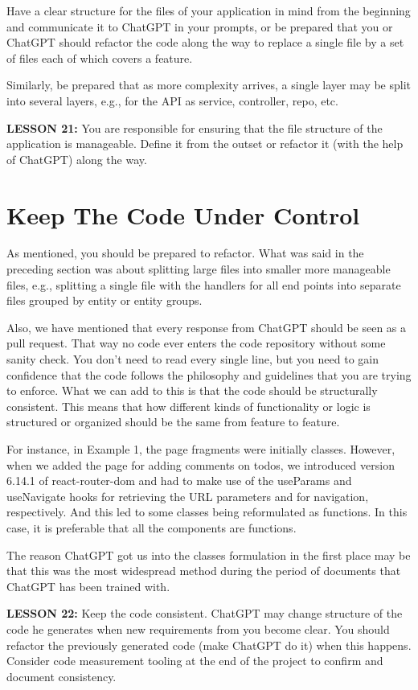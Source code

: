 \documentclass[runningheads]{llncs}
\begin{document}
Have a clear structure for the files of your application in mind from the beginning and communicate it to ChatGPT in your prompts, or be prepared that you or ChatGPT should refactor the code along the way to replace a single file by a set of files each of which covers a feature.

Similarly, be prepared that as more complexity arrives, a single layer may be split into several layers, e.g., for the API as service, controller, repo, etc.

\textbf{LESSON 21:} You are responsible for ensuring that the file structure of the application is manageable. Define it from the outset or refactor it (with the help of ChatGPT) along the way.

\section{Keep The Code Under Control}
As mentioned, you should be prepared to refactor. What was said in the preceding section was about splitting large files into smaller more manageable files, e.g., 
splitting a single file with the handlers for all end points into separate files grouped by entity or entity groups.

Also, we have mentioned that every response from ChatGPT should be seen as a pull request. That way no code ever enters the code repository without some sanity check. You don't need to read every single line, but you need to gain confidence that the code follows the philosophy and guidelines that you are trying to enforce. What we can add to this is that the code should be structurally consistent. This means that how different kinds of functionality or logic is structured or organized should be the same from feature to feature.
  
 For instance, in Example 1, the page fragments were initially classes. However, when we added the page for adding comments on todos, we introduced version 6.14.1 of react-router-dom and had to make use of the useParams and useNavigate hooks for retrieving the URL parameters and for navigation, respectively. And this led to some classes being reformulated as functions. In this case, it is preferable that all the components are functions.

The reason ChatGPT got us into the classes formulation in the first place may be that this was the most widespread method during the period of documents that ChatGPT has 
been trained with.

\textbf{LESSON 22:} Keep the code consistent. ChatGPT may change structure of the code he generates when new requirements from you become clear. You should refactor the previously generated code (make ChatGPT do it) when this happens. Consider code measurement tooling at the end of the project to confirm and document consistency.
\end{document}
